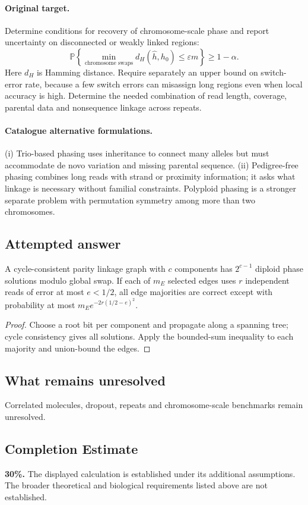 \documentclass[11pt]{article}
\begin{document}
\paragraph{Original target.}
Determine conditions for recovery of chromosome-scale phase and report uncertainty on disconnected or weakly linked regions:
\[\mathbb{P}\!\left\{\min_{\text{chromosome swaps}}d_H(\widehat h,h_0)\le\varepsilon m\right\}\ge1-\alpha.\]
Here $d_H$ is Hamming distance. Require separately an upper bound on switch-error rate, because a few switch errors can misassign long regions even when local accuracy is high. Determine the needed combination of read length, coverage, parental data and nonsequence linkage across repeats.
\paragraph{Catalogue alternative formulations.}
(i) Trio-based phasing uses inheritance to connect many alleles but must accommodate de novo variation and missing parental sequence. (ii) Pedigree-free phasing combines long reads with strand or proximity information; it asks what linkage is necessary without familial constraints. Polyploid phasing is a stronger separate problem with permutation symmetry among more than two chromosomes.
\subsection{Attempted answer}
\begin{proposition}
A cycle-consistent parity linkage graph with $c$ components has $2^{c-1}$ diploid phase solutions modulo global swap. If each of $m_E$ selected edges uses $r$ independent reads of error at most $e<1/2$, all edge majorities are correct except with probability at most $m_Ee^{-2r(1/2-e)^2}$.
\end{proposition}
\begin{proof}
Choose a root bit per component and propagate along a spanning tree; cycle consistency gives all solutions. Apply the bounded-sum inequality to each majority and union-bound the edges.
\end{proof}
\subsection{What remains unresolved}
Correlated molecules, dropout, repeats and chromosome-scale benchmarks remain unresolved.
\subsection{Completion Estimate}
\textbf{30\%.} The displayed calculation is established under its additional assumptions. The broader theoretical and biological requirements listed above are not established.
\end{document}
